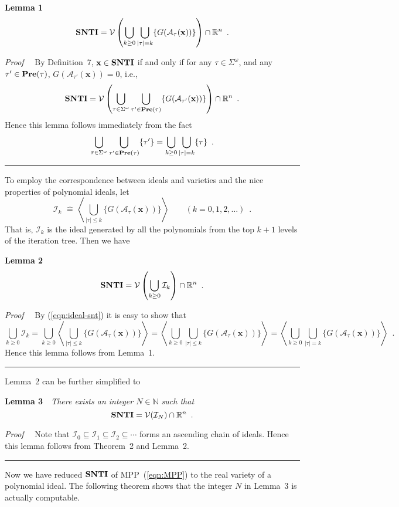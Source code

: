 \documentclass{article}
\newcommand{\rulex}{\hfill\rule{1mm}{3mm}}
\newcommand{\A}{\mathcal{A}}
\newcommand{\I}{\mathcal{I}}
\newcommand{\V}{\mathcal{V}}
\newcommand{\define}{\widehat{=}}
\newcommand{\xx}{\mathbf{x}}
\newcommand{\SNTI}{{\bf SNTI}}
\begin{document}
{\bf Lemma 1}~~{\[
\SNTI=\V\left( \bigcup_{k \geq 0} \bigcup_{|\tau|=k} \{G(\A_{\tau}(\xx))\} \right) \cap \mathbb{R}^n \enspace .
\]}

{\it Proof}~~ By Definition~7, $\xx \in \SNTI$ if and only if for any $\tau \in \Sigma^{\omega}$, and any $\tau' \in {\bf Pre}(\tau)$, $G(\A_{\tau'}(\xx))=0$, i.e.,
\[
\SNTI=\V\left( \bigcup_{\tau \in \Sigma^{\omega}} \bigcup_{\tau' \in {\bf Pre}(\tau)} \{G(\A_{\tau'}(\xx))\} \right) \cap \mathbb{R}^n \enspace .
\]
Hence this lemma follows immediately from the fact
\[
\bigcup_{\tau \in \Sigma^{\omega}} \bigcup_{\tau' \in {\bf Pre}(\tau)} \{\tau'\} = \bigcup_{k \geq 0} \bigcup_{|\tau|=k} \{\tau\} \enspace .
\]
\rulex

To employ the correspondence between ideals and varieties and the nice properties of polynomial ideals, let
\begin{equation}\label{eqn:ideal-snt}
\I_k \,\,\define\,\left\langle \bigcup_{|\tau| \leq k} \{G(\A_{\tau}(\xx))\} \right\rangle \qquad (k=0,1,2,\ldots) \enspace .
\end{equation}
That is, $\I_k$ is the ideal generated by all the polynomials from the top $k+1$ levels of the iteration tree. Then we have

{\bf Lemma 2}~~{\[
\SNTI=\V\left( \bigcup_{k \geq 0} \I_k \right) \cap \mathbb{R}^n \enspace .
\]}

{\it Proof}~~ By (\ref{eqn:ideal-snt}) it is easy to show that
\[
\bigcup_{k \geq 0}\I_k = \bigcup_{k \geq 0} \left\langle \bigcup_{|\tau| \leq k} \{G(\A_{\tau}(\xx))\} \right\rangle = \left\langle \bigcup_{k \geq 0} \bigcup_{|\tau| \leq k} \{G(\A_{\tau}(\xx))\} \right\rangle  = \left\langle \bigcup_{k \geq 0} \bigcup_{|\tau|=k} \{G(\A_{\tau}(\xx))\} \right\rangle \enspace .
\]
Hence this lemma follows from Lemma~1. \rulex

Lemma~2 can be further simplified to

{\bf Lemma 3}~~{\it There exists an integer $N \in \mathbb{N}$ such that
\[
\SNTI = \V(\I_N) \cap \mathbb{R}^n \enspace .
\]}

{\it Proof}~~ Note that $\I_0 \subseteq \I_1 \subseteq \I_2 \subseteq \cdots$ forms an ascending chain of ideals. Hence this lemma follows from Theorem~2 and Lemma~2. \rulex

Now we have reduced $\SNTI$ of MPP~(\ref{eqn:MPP}) to the real variety of a polynomial ideal. The following theorem shows that the integer $N$ in Lemma~3 is actually computable.
\end{document}
